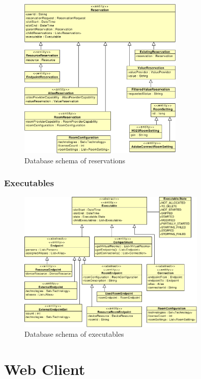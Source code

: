 \begin{figure}[ht!]
\centering\includegraphics[width=0.7\textwidth]{diagrams/cd_reservations}
\caption{Database schema of reservations}
\label{fig:reservations}
\end{figure}



\cleardoublepage
\subsection{Executables}

\begin{figure}[ht!]
\centering\includegraphics[width=0.8\textwidth]{diagrams/cd_executables}
\caption{Database schema of executables}
\label{fig:executables}
\end{figure}




\chapter{Web Client}

